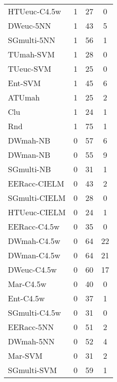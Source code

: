 \begin{table}[h]
\begin{center}
{\begin{tabular}{lccc}
HTUeuc-C4.5w & 1 & 27 & 0 \\
DWeuc-5NN  & 1 & 43 & 5 \\
SGmulti-5NN & 1 & 56 & 1 \\
TUmah-SVM  & 1 & 28 & 0 \\
TUeuc-SVM  & 1 & 25 & 0 \\
Ent-SVM    & 1 & 45 & 6 \\
ATUmah     & 1 & 25 & 2 \\
Clu        & 1 & 24 & 1 \\
Rnd        & 1 & 75 & 1 \\
DWmah-NB   & 0 & 57 & 6 \\
DWman-NB   & 0 & 55 & 9 \\
SGmulti-NB & 0 & 31 & 1 \\
EERacc-CIELM & 0 & 43 & 2 \\
SGmulti-CIELM & 0 & 28 & 0 \\
HTUeuc-CIELM & 0 & 24 & 1 \\
EERacc-C4.5w & 0 & 35 & 0 \\
DWmah-C4.5w & 0 & 64 & 22 \\
DWman-C4.5w & 0 & 64 & 21 \\
DWeuc-C4.5w & 0 & 60 & 17 \\
Mar-C4.5w  & 0 & 40 & 0 \\
Ent-C4.5w  & 0 & 37 & 1 \\
SGmulti-C4.5w & 0 & 31 & 0 \\
EERacc-5NN & 0 & 51 & 2 \\
DWmah-5NN  & 0 & 52 & 4 \\
Mar-SVM    & 0 & 31 & 2 \\
SGmulti-SVM & 0 & 59 & 1 \\
\end{tabular}
}
\label{contaFriedPares}
\end{center}
\end{table}